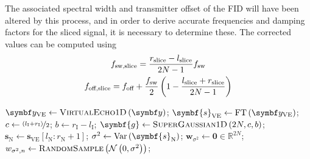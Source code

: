 The associated spectral width and transmitter offset of the \ac{FID} will have
been altered by this process, and in order to derive accurate frequencies and
damping factors for the sliced signal, it is necessary to determine these. The
corrected values can be computed using
\begin{subequations}
    \begin{gather}
        f_{\text{sw,slice}} = \frac{r_{\text{slice}} - l_{\text{slice}}}{2N - 1} f_{\mathrm{sw}}\\
        f_{\text{off,slice}} = f_{\text{off}} + \frac{f_{\mathrm{sw}}}{2} \left(
            1 - \frac{l_{\text{slice}} + r_{\text{slice}}}{2N - 1}
        \right)
    \end{gather}
\end{subequations}

\begin{algorithm}
    \begin{algorithmic}
        \caption[
            The filtering procedure for 1D data.
        ]
        {
            The filtering procedure for 1D data.
            $l/r_{\text{I/N}}$ denotes the left ($l$)/right ($r$) bound of the
            region of interest (I)/noise region (N), as a vector index.
            All of these values should be members of the set $\lbrace 0,
            \cdots, 2N - 1 \rbrace$.
            These would typically be provided in units of \unit{\hertz} or
            \unit{\partspermillion} by a user; conversion to indices can
            be carried out using \cref{eq:fidx}.
        }
        \label{alg:filter-1d}
            \State $\by_{\text{VE}} \gets \textsc{VirtualEcho$1$D}\left(\by\right)$;
            \State $\symbf{s}_{\text{VE}} \gets \FT\left(\by_{\text{VE}}\right)$;
            \State $c \gets \nicefrac{\left(l_{\text{I}} + r_{\text{I}}\right)}{2}$;
            \State $b \gets r_{\text{I}} - l_{\text{I}}$;
            \State $\symbf{g} \gets \textsc{SuperGaussian$1$D}\left(2N, c, b\right)$;
            \State $\symbf{s}_{\text{N}} \gets \symbf{s}_{\text{VE}} \left[
                l_{\text{N}} : r_{\text{N}} + 1
            \right]
            $;
            \State $\sigma^2 \gets \Var\left(\symbf{s}_{\text{N}}\right)$;
            \State $\symbf{w}_{\sigma^2} \gets \symbf{0} \in \mathbb{R}^{2N}$;
            \State $w_{\sigma^2,n} \gets \textsc{RandomSample}\left(\mathcal{N}\left(0, \sigma^2\right)\right)$;

\end{algorithmic}
\end{algorithm}
